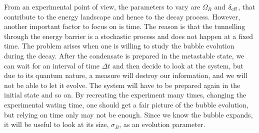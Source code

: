 From an experimental point of view, the parameters to vary are $\Omega_R$ and $\delta_{\rm eff}$, that contribute to the energy landscape and hence to the decay process. However, another important factor to focus on is time. The reason is that the tunnelling through the energy barrier is a stochastic process and does not happen at a fixed time. The problem arises when one is willing to study the bubble evolution during the decay. After the condensate is prepared in the metastable state, we can wait for an interval of time $\Delta t$ and then decide to look at the system, but due to its quantum nature, a measure will destroy our information, and we will not be able to let it evolve. The system will have to be prepared again in the initial state and so on. By recreating the experiment many times, changing the experimental wating time, one should get a fair picture of the bubble evolution, but relying on time only may not be enough. Since we know the bubble expands, it will be useful to look at its size, $\sigma_B$, as an evolution parameter.




